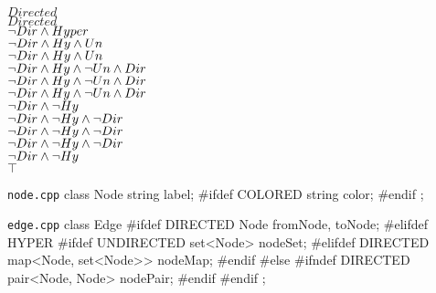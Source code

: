 \begin{frame}[fragile]{\myframetitle}
\begin{mycolumns}[t,columns=4,widths={31,20,20,29},animation=none]
{\begin{flushright}
				{\color{black}$Directed$}\\
				{\color{black}$Directed$}\\
				{\color{black}$\neg Dir \wedge Hyper$}\\
				{\color{black}$\neg Dir \wedge Hy \wedge Un$}\\
				{\color{black}$\neg Dir \wedge Hy \wedge Un$}\\
				{\color{black}$\neg Dir \wedge Hy \wedge \neg Un \wedge Dir$}\\
				{\color{black}$\neg Dir \wedge Hy \wedge \neg Un \wedge Dir$}\\
				{\color{black}$\neg Dir \wedge Hy \wedge \neg Un \wedge Dir$}\\
				{\color{black}$\neg Dir \wedge \neg Hy$}\\
				{\color{black}$\neg Dir \wedge \neg Hy \wedge \neg Dir$}\\
				{\color{black}$\neg Dir \wedge \neg Hy \wedge \neg Dir$}\\
				{\color{black}$\neg Dir \wedge \neg Hy \wedge \neg Dir$}\\
				{\color{black}$\neg Dir \wedge \neg Hy$}\\
				{\color{black}$\top$}
			\end{flushright}
		}
	\mynextcolumn
		\begin{cpptight}[basicstyle=\tiny]{\texttt{node.cpp}}
class Node {
	string label;
#ifdef COLORED
	string color;
#endif
};
		\end{cpptight}
		\begin{cpptight}[basicstyle=\tiny]{\texttt{edge.cpp}}
class Edge {
#ifdef DIRECTED
	Node fromNode, toNode;
#elifdef HYPER
#ifdef UNDIRECTED
	set<Node> nodeSet;
#elifdef DIRECTED
	map<Node, set<Node>> nodeMap;
#endif
#else
#ifndef DIRECTED
	pair<Node, Node> nodePair;
#endif
#endif
};
		\end{cpptight}
	\end{mycolumns}
\end{frame}

